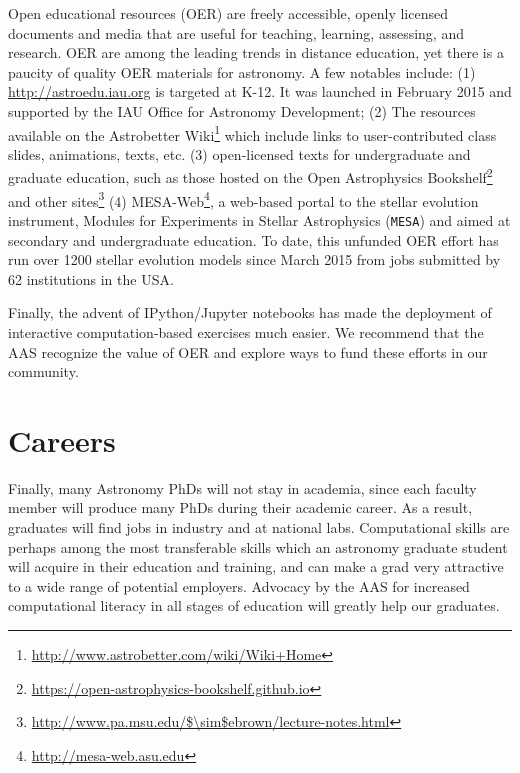 \documentclass[11pt]{article}
\begin{document}
Open educational resources (OER) are freely accessible, openly
licensed documents and media that are useful for teaching, learning,
assessing, and research. OER are among the leading trends in distance
education, yet there is a paucity of quality OER materials for
astronomy. A few notables include: (1)
\href{http://astroedu.iau.org}{http://astroedu.iau.org} is targeted
at K-12. It was launched in February 2015 and supported by the IAU
Office for Astronomy Development; (2) The resources available on the
Astrobetter
Wiki\footnote{\url{http://www.astrobetter.com/wiki/Wiki+Home}} which
include links to user-contributed class slides, animations, texts,
etc. (3) open-licensed texts for undergraduate and graduate education,
such as those hosted on the Open Astrophysics
Bookshelf\footnote{\url{https://open-astrophysics-bookshelf.github.io}}
and other
sites\footnote{\url{http://www.pa.msu.edu/$\sim$ebrown/lecture-notes.html}}
(4) MESA-Web\footnote{\url{http://mesa-web.asu.edu}}, a
web-based portal to the stellar evolution instrument, Modules for
Experiments in Stellar Astrophysics ({\tt MESA}) and aimed at
secondary and undergraduate education. To date, this unfunded OER
effort has run over 1200 stellar evolution models since March 2015
from jobs submitted by 62 institutions in the USA.

Finally, the advent of IPython/Jupyter notebooks has made the
deployment of interactive computation-based exercises much easier.  We
recommend that the AAS recognize the value of OER and explore ways to
fund these efforts in our community.

\section{Careers}

Finally, many Astronomy PhDs will not stay in academia, since each
faculty member will produce many PhDs during their academic career.
As a result, graduates will find jobs in industry and at national
labs. Computational skills are perhaps among the most transferable
skills which an astronomy graduate student will acquire in their
education and training, and can make a grad very attractive to a wide
range of potential employers.  Advocacy by the AAS for increased
computational literacy in all stages of education will greatly help
our graduates.
\end{document}

